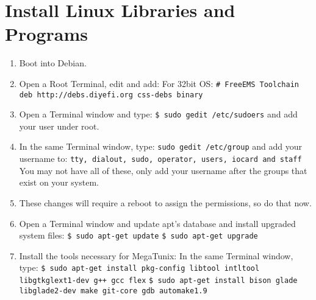 \documentclass[12pt,notitlepage,onecolumn,oneside,openany]{memoir}
\begin{document}
\chapter{\textsf{Install Linux Libraries and Programs}}

\begin{enumerate}
\item \textsf{Boot into Debian.}
\item \textsf{Open a Root Terminal, edit  and add:} \newline
	\textsf{For 32bit OS:} \newline
\texttt{\# FreeEMS Toolchain} \newline
\texttt{deb http://debs.diyefi.org css-debs binary}

\item \textsf{Open a Terminal window and type:} \newline
      \texttt{\$ sudo gedit /etc/sudoers} \newline
      \textsf{and add your user under root.}

\item \textsf{In the same Terminal window, type:} \newline
      \texttt{sudo gedit /etc/group} \textsf{ and add your username to:} \newline
      \texttt{tty, dialout, sudo, operator, users, iocard and staff} \newline
      \textsf{You may not have all of these, only add your username after the groups that exist on your system.}

\item \textsf{These changes will require a reboot to assign the permissions, so do that now.}

\item \textsf{Open a Terminal window and update apt's database and install upgraded system files:} \newline
      \texttt{\$ sudo apt-get update} \newline
      \texttt{\$ sudo apt-get upgrade}

\item \textsf{Install the tools necessary for MegaTunix:} \newline
      \textsf{In the same Terminal window, type:} \newline
      \texttt{\$ sudo apt-get install pkg-config libtool intltool libgtkglext1-dev g++ gcc flex} \newline
      \texttt{\$ sudo apt-get install bison glade libglade2-dev make git-core gdb automake1.9}


\end{enumerate}
\end{document}
